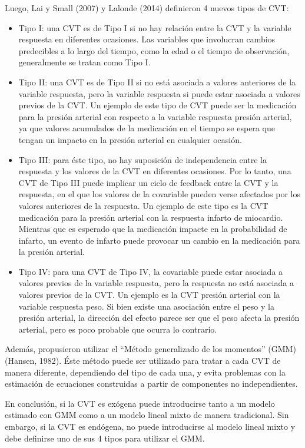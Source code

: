 \documentclass[spanish]{article}
\numberwithin{figure}{subsection}
\numberwithin{equation}{subsection}
\numberwithin{table}{subsection}
\begin{document}
Luego, Lai y Small (2007) y Lalonde (2014) definieron 4 nuevos tipos de CVT:

\begin{itemize}
	\item Tipo I: una CVT es de Tipo I si no hay relación entre la
	CVT y la variable respuesta en diferentes ocasiones. Las variables que
	involucran cambios predecibles a lo largo del tiempo, como la edad o el
	tiempo de observación, generalmente se tratan como Tipo I.
	\item Tipo II: una CVT es de Tipo II si no está asociada a valores
	anteriores de la variable respuesta, pero la variable respuesta si puede
	estar asociada a valores previos de la CVT. Un ejemplo de este tipo de CVT
	puede ser la medicación para la presión arterial con respecto a la variable
	respuesta presión arterial, ya que valores acumulados de la medicación en
	el tiempo se espera que tengan un impacto en la presión arterial en
	cualquier ocasión.
	\item Tipo III: para éste tipo, no hay suposición de independencia entre la
	respuesta y los valores de la CVT en diferentes ocasiones. Por lo tanto, una
	CVT de Tipo III puede implicar un ciclo de feedback entre la CVT y la
	respuesta, en el que los valores de la covariable pueden verse afectados por
	los valores anteriores de la respuesta. Un ejemplo de este tipo es la CVT
	medicación para la presión arterial con la respuesta infarto de miocardio.
	Mientras que es esperado que la medicación impacte en la probabilidad de
	infarto, un evento de infarto puede provocar un cambio en la medicación para
	la presión arterial.
	\item Tipo IV: para una CVT de Tipo IV, la covariable puede estar asociada a
	valores previos de la variable respuesta, pero la respuesta no está asociada
	a valores previos de la CVT. Un ejemplo es la CVT presión arterial con la
	variable respuesta peso. Si bien existe una asociación entre el peso y la
	presión arterial, la dirección del efecto parece ser que el peso afecta la
	presión arterial, pero es poco probable que ocurra lo contrario.
\end{itemize}

Además, propusieron utilizar el ``Método generalizado de los momentos'' (GMM)
(Hansen, 1982). Éste método puede ser utilizado para tratar a cada CVT de manera
diferente, dependiendo del tipo de cada una, y evita problemas con la estimación
de ecuaciones construidas a partir de componentes no independientes.

En conclusión, si la CVT es exógena puede introducirse tanto a un modelo
estimado con GMM como a un modelo lineal mixto de manera tradicional. Sin
embargo, si la CVT es endógena, no puede introducirse al modelo lineal mixto y
debe definirse uno de sus 4 tipos para utilizar el GMM.
\end{document}
